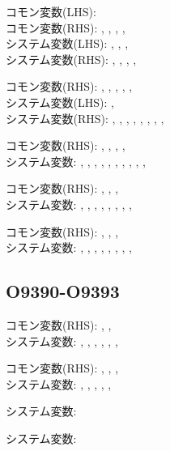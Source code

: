 \begin{hosoku}\small
コモン変数(LHS): \\
コモン変数(RHS): , , , , \\
システム変数(LHS): , , , \\
システム変数(RHS): , , , , 
\end{hosoku}

\begin{hosoku}\small
コモン変数(RHS): , , , , , \\
システム変数(LHS): , \\
システム変数(RHS): , , , , , , , , 
\end{hosoku}

\begin{hosoku}\small
コモン変数(RHS): , , , , \\
システム変数: , , , , , , , , , , 
\end{hosoku}

\begin{hosoku}\small
コモン変数(RHS): , , , \\
システム変数: , , , , , , , , 
\end{hosoku}

\begin{hosoku}\small
コモン変数(RHS): , , , \\
システム変数: , , , , , , , , 
\end{hosoku}

\subsection{O9390-O9393}
\begin{hosoku}\small
コモン変数(RHS): , , \\
システム変数: , , , , , , 
\end{hosoku}

\begin{hosoku}\small
コモン変数(RHS): , , , \\
システム変数: , , , , , 
\end{hosoku}

\begin{hosoku}\small
システム変数: 
\end{hosoku}

\begin{hosoku}\small
システム変数: 
\end{hosoku}

